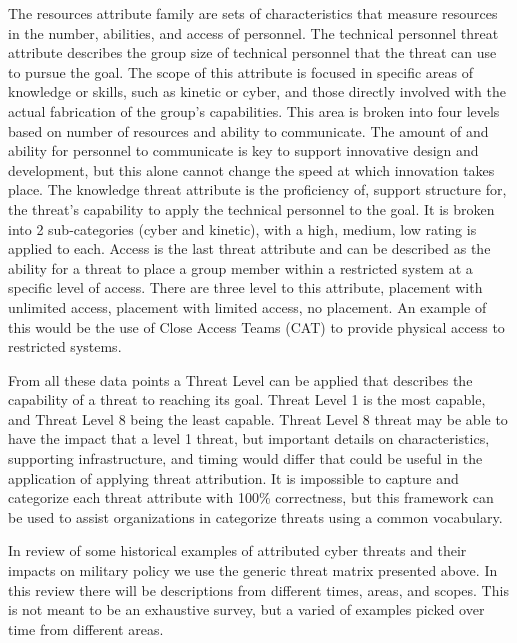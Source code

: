 \documentclass[12pt]{report}
\begin{document}
The resources attribute family are sets of characteristics that measure resources in the number, abilities, and access of personnel.   The technical personnel threat attribute describes the group size of technical personnel that the threat can use to pursue the goal.   The scope of this attribute is focused in specific areas of knowledge or skills, such as kinetic or cyber, and those directly involved with the actual fabrication of the group’s capabilities.  This area is broken into four levels based on number of resources and ability to communicate.  The amount of and ability for personnel to communicate is key to support innovative design and development, but this alone cannot change the speed at which innovation takes place.  The knowledge threat attribute is the proficiency of, support structure for, the threat’s capability to apply the technical personnel to the goal.  It is broken into 2 sub-categories (cyber and kinetic), with a high, medium, low rating is applied to each.  Access is the last threat attribute and can be described as the ability for a threat to place a group member within a restricted system at a specific level of access.  There are three level to this attribute, placement with unlimited access, placement with limited access, no placement.  An example of this would be the use of Close Access Teams (CAT) to provide physical access to restricted systems.

From all these data points a Threat Level can be applied that describes the capability of a threat to reaching its goal.  Threat Level 1 is the most capable, and Threat Level 8 being the least capable.  Threat Level 8 threat may be able to have the impact that a level 1 threat, but important details on characteristics, supporting infrastructure, and timing would differ that could be useful in the application of applying threat attribution.  It is impossible to capture and categorize each threat attribute with 100\% correctness, but this framework can be used to assist organizations in categorize threats using a common vocabulary. 

In review of some historical examples of attributed cyber threats and their impacts on military policy we use the generic threat matrix presented above.  In this review there will be descriptions from different times, areas, and scopes.  This is not meant to be an exhaustive survey, but a varied of examples picked over time from different areas. 
\end{document}
